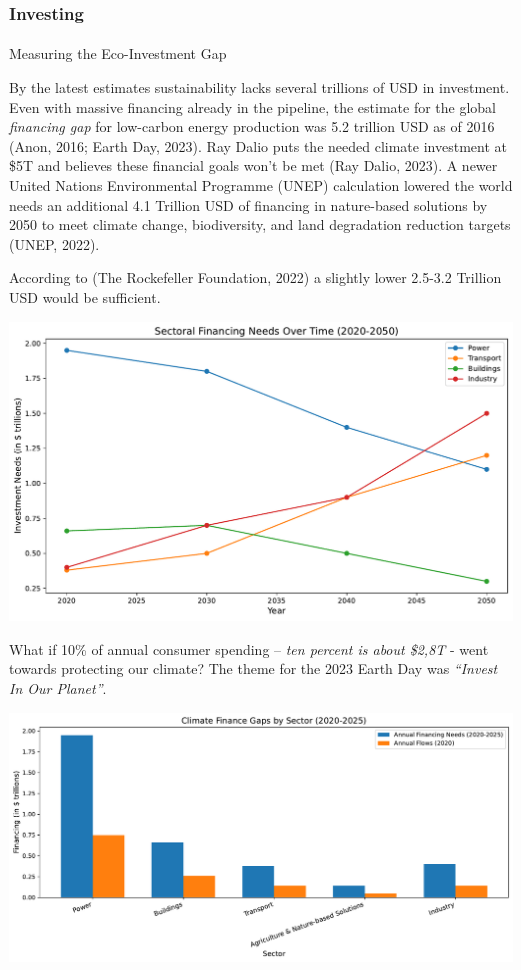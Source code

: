 \documentclass[
  letterpaper,
  DIV=11,
  numbers=noendperiod]{scrartcl}
\makeatletter
\let\oldparagraph\paragraph
\renewcommand{\paragraph}{
    \@ifstar
      \xxxParagraphStar
      \xxxParagraphNoStar
  }
\newcommand{\xxxParagraphStar}[1]{\oldparagraph*{#1}\mbox{}}
\newcommand{\xxxParagraphNoStar}[1]{\oldparagraph{#1}\mbox{}}
\makeatother
\begin{document}
\subsubsection{Investing}\label{investing}

\paragraph{Measuring the Eco-Investment
Gap}\label{measuring-the-eco-investment-gap}

By the latest estimates sustainability lacks several trillions of USD in
investment. Even with massive financing already in the pipeline, the
estimate for the global \emph{financing gap} for low-carbon energy
production was 5.2 trillion USD as of 2016 (Anon, 2016; Earth Day,
2023). Ray Dalio puts the needed climate investment at \$5T and believes
these financial goals won't be met (Ray Dalio, 2023). A newer United
Nations Environmental Programme (UNEP) calculation lowered the world
needs an additional 4.1 Trillion USD of financing in nature-based
solutions by 2050 to meet climate change, biodiversity, and land
degradation reduction targets (UNEP, 2022).

According to (The Rockefeller Foundation, 2022) a slightly lower 2.5-3.2
Trillion USD would be sufficient.

\includegraphics{_thesis_files/figure-pdf/cell-34-output-1.pdf}

What if 10\% of annual consumer spending -- \emph{ten percent is about
\$2,8T} - went towards protecting our climate? The theme for the 2023
Earth Day was \emph{``Invest In Our Planet''}.

\includegraphics{_thesis_files/figure-pdf/cell-35-output-1.pdf}
\end{document}
